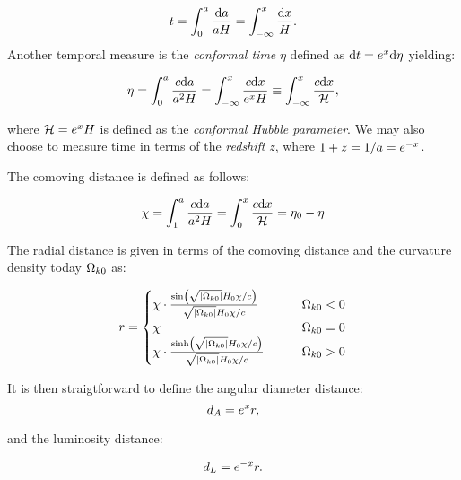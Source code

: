     \begin{equation}\label{eq:m1:theory:measures:cosmic_time}
        t = \int_0^a\frac{\mathrm{d} a}{aH} = \int_{-\infty}^{x}\frac{\mathrm{d} x}{H}.
    \end{equation}
    Another temporal measure is the \textit{conformal time} $\eta$ defined as $\mathrm{d} t = e^x\mathrm{d}\eta$ yielding:

    \begin{equation}\label{eq:m1:theory:measures:conformal_time}
        \eta = \int_0^a\frac{c\mathrm{d} a}{a^2H} = \int_{-\infty}^{x}\frac{c\mathrm{d} x}{e^xH} \equiv \int_{-\infty}^{x}\frac{c\mathrm{d} x}{\mathcal{H}},
    \end{equation}

    where $\mathcal{H}=e^xH$ is defined as the \textit{conformal Hubble parameter}. We may also choose to measure time in terms of the \textit{redshift} $z$, where $1+z = 1/a = e^{-x}$.

    The comoving distance is defined as follows:

    \begin{equation}
        \label{eq:m1:theory:measures:conformal ditance}
        \chi = \int_1^a\frac{c\mathrm{d} a}{a^2H} = \int_0^x\frac{c\mathrm{d} x}{\mathcal{H}} = \eta_0-\eta
    \end{equation}
  

    The radial distance is given in terms of the comoving distance and the curvature density today $\Omega_{k0}$ as:

    \begin{equation}\label{eq:m1:theory:measures:r_equation_def}
        r = \begin{cases}
            \chi \cdot \frac{\sin\left(\sqrt{\abs{\Omega_{k0}}}H_0\chi/c\right)}{\sqrt{\abs{\Omega_{k0}}}H_0\chi/c} \qquad &\Omega_{k0} < 0 \\
            \chi \qquad &\Omega_{k0} = 0 \\
            \chi \cdot \frac{\sinh\left(\sqrt{\abs{\Omega_{k0}}}H_0\chi/c\right)}{\sqrt{\abs{\Omega_{k0}}}H_0\chi/c} \qquad &\Omega_{k0} > 0
        \end{cases}
    \end{equation}
    
    It is then straigtforward to define the angular diameter distance:
    \begin{equation}\label{eq:m1:theory:measures:angular_distance_def}
        d_A = e^{x}r,
    \end{equation}

    and the luminosity distance:
    
    \begin{equation}\label{eq:m1:theory:measures:luminosity_distance}
        d_L = e^{-x}r.
    \end{equation}

